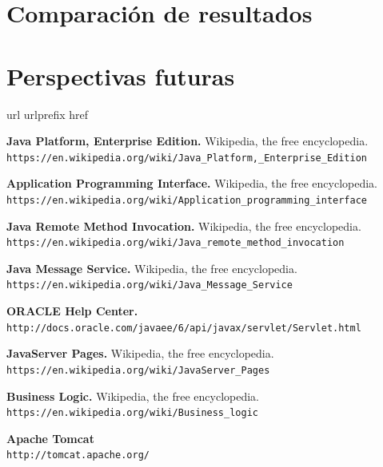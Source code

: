\documentclass[a4paper, 10pt]{article}
\begin{document}
\section{Comparación de resultados}

\section{Perspectivas futuras}
	

\newpage
\begin{thebibliography}{10}
	\expandafter\ifx\csname url\endcsname\relax
	  \def\url#1{\texttt{#1}}\fi
	\expandafter\ifx\csname urlprefix\endcsname\relax\def\urlprefix{URL }\fi
	\expandafter\ifx\csname href\endcsname\relax
	  \def\href#1#2{#2} \def\path#1{#1}\fi
	
	\textbf{Java Platform, Enterprise Edition.} Wikipedia, the free encyclopedia.\\
		\url{https://en.wikipedia.org/wiki/Java_Platform,_Enterprise_Edition}
	
	\textbf{Application Programming Interface.} Wikipedia, the free encyclopedia.\\
		\url{https://en.wikipedia.org/wiki/Application_programming_interface}
	
	\textbf{Java Remote Method Invocation.} Wikipedia, the free encyclopedia.\\
		\url{https://en.wikipedia.org/wiki/Java_remote_method_invocation}
	
	\textbf{Java Message Service.} Wikipedia, the free encyclopedia.\\
		\url{https://en.wikipedia.org/wiki/Java_Message_Service}
	
	\textbf{ORACLE Help Center.}\\
		\url{http://docs.oracle.com/javaee/6/api/javax/servlet/Servlet.html}
	
	\textbf{JavaServer Pages.} Wikipedia, the free encyclopedia.\\
		\url{https://en.wikipedia.org/wiki/JavaServer_Pages}
	
	\textbf{Business Logic.} Wikipedia, the free encyclopedia.\\
		\url{https://en.wikipedia.org/wiki/Business_logic}
	
	\textbf{Apache Tomcat}\\
		\url{http://tomcat.apache.org/}


\end{thebibliography}
\end{document}
